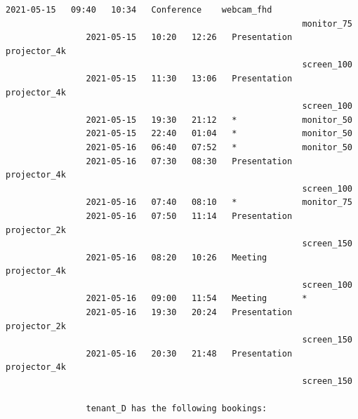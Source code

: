 \documentclass{article}
\begin{document}
\begin{Verbatim}[gobble=8]
                2021-05-15   09:40   10:34   Conference    webcam_fhd
                                                           monitor_75
                2021-05-15   10:20   12:26   Presentation  projector_4k
                                                           screen_100
                2021-05-15   11:30   13:06   Presentation  projector_4k
                                                           screen_100
                2021-05-15   19:30   21:12   *             monitor_50
                2021-05-15   22:40   01:04   *             monitor_50
                2021-05-16   06:40   07:52   *             monitor_50
                2021-05-16   07:30   08:30   Presentation  projector_4k
                                                           screen_100
                2021-05-16   07:40   08:10   *             monitor_75
                2021-05-16   07:50   11:14   Presentation  projector_2k
                                                           screen_150
                2021-05-16   08:20   10:26   Meeting       projector_4k
                                                           screen_100
                2021-05-16   09:00   11:54   Meeting       *
                2021-05-16   19:30   20:24   Presentation  projector_2k
                                                           screen_150
                2021-05-16   20:30   21:48   Presentation  projector_4k
                                                           screen_150
                
                tenant_D has the following bookings:
                

\end{Verbatim}
\end{document}
